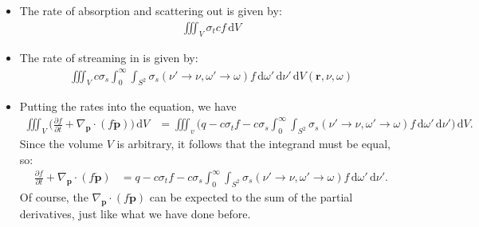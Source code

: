 \documentclass[10pt]{article}
\newcommand{\dee}{\mathrm{d}}
\newcommand{\ve}[1]{\mathbf{#1}}
\newcommand{\ra}{\rightarrow}
\begin{document}
\begin{itemize}
    \item The rate of absorption and scattering out is given by:
    \begin{align*}
      \iiint_V \sigma_t c f\, \dee V
    \end{align*}

    \item The rate of streaming in is given by:
    \begin{align*}
      \iiint_V c \sigma_s \int_{0}^\infty \int_{S^2} \sigma_s(\nu' \ra \nu, \omega' \ra \omega) f\, \dee \omega'\, \dee \nu' \, \dee V(\ve{r}, \nu, \omega)
    \end{align*}

    \item Putting the rates into the equation, we have
    \begin{align*}
      \iiint_V \bigg( \frac{\partial f}{\partial t} + \nabla_{\ve{p}} \cdot (f \dot{\ve{p}}) \bigg)\, \dee V
      &= \iiint_v \bigg( q - c\sigma_t f - c\sigma_s \int_{0}^\infty \int_{S^2} \sigma_s(\nu' \ra \nu, \omega' \ra \omega) f\, \dee \omega'\, \dee \nu' \bigg)\, \dee V.
    \end{align*}
    Since the volume $V$ is arbitrary, it follows that the integrand must be equal, so:
    \begin{align*}
      \frac{\partial f}{\partial t} + \nabla_{\ve{p}} \cdot (f \dot{\ve{p}})
      &= q - c\sigma_t f - c\sigma_s \int_{0}^\infty \int_{S^2} \sigma_s(\nu' \ra \nu, \omega' \ra \omega) f\, \dee \omega'\, \dee \nu'.
    \end{align*}
    Of course, the $\nabla_{\ve{p}} \cdot (f \dot{\ve{p}})$ can be expected to the sum of the partial derivatives, just like what we have done before.
  \end{itemize}
\end{document}
